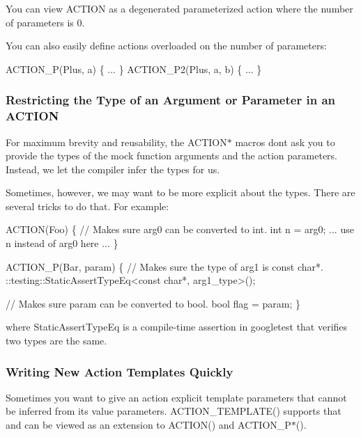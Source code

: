 You can view {\ttfamily A\+C\+T\+I\+ON} as a degenerated parameterized action where the number of parameters is 0.

You can also easily define actions overloaded on the number of parameters\+:


\begin{DoxyCode}
ACTION\_P(Plus, a) \{ ... \}
ACTION\_P2(Plus, a, b) \{ ... \}
\end{DoxyCode}


\subsubsection*{Restricting the Type of an Argument or Parameter in an A\+C\+T\+I\+ON}

For maximum brevity and reusability, the {\ttfamily A\+C\+T\+I\+O\+N$\ast$} macros don\textquotesingle{}t ask you to provide the types of the mock function arguments and the action parameters. Instead, we let the compiler infer the types for us.

Sometimes, however, we may want to be more explicit about the types. There are several tricks to do that. For example\+:


\begin{DoxyCode}
ACTION(Foo) \{
  \textcolor{comment}{// Makes sure arg0 can be converted to int.}
  \textcolor{keywordtype}{int} n = arg0;
  ... use n instead of arg0 here ...
\}

ACTION\_P(Bar, param) \{
  \textcolor{comment}{// Makes sure the type of arg1 is const char*.}
  ::testing::StaticAssertTypeEq<const char*, arg1\_type>();

  \textcolor{comment}{// Makes sure param can be converted to bool.}
  \textcolor{keywordtype}{bool} flag = param;
\}
\end{DoxyCode}


where {\ttfamily Static\+Assert\+Type\+Eq} is a compile-\/time assertion in googletest that verifies two types are the same.

\subsubsection*{Writing New Action Templates Quickly}

Sometimes you want to give an action explicit template parameters that cannot be inferred from its value parameters. {\ttfamily A\+C\+T\+I\+O\+N\+\_\+\+T\+E\+M\+P\+L\+A\+T\+E()} supports that and can be viewed as an extension to {\ttfamily A\+C\+T\+I\+O\+N()} and {\ttfamily A\+C\+T\+I\+O\+N\+\_\+\+P$\ast$()}.

